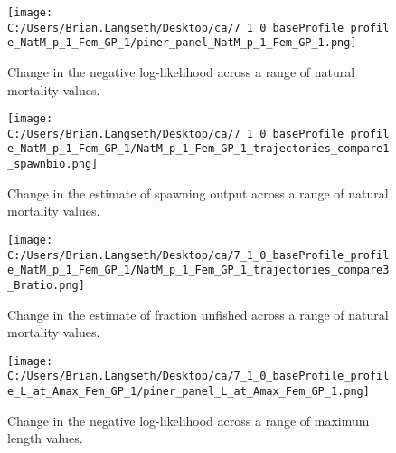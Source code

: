 \documentclass[11pt,
  english,
  letterpaper,
]{article}
\begin{document}
\begin{figure}
\centering
\texttt{[image: C:/Users/Brian.Langseth/Desktop/ca/7\_1\_0\_baseProfile\_profile\_NatM\_p\_1\_Fem\_GP\_1/piner\_panel\_NatM\_p\_1\_Fem\_GP\_1.png]}
\caption{Change in the negative log-likelihood across a range of natural mortality values.\label{fig:m-profile}}
\end{figure}

\tagmcend\tagstructend


\begin{figure}
\centering
\texttt{[image: C:/Users/Brian.Langseth/Desktop/ca/7\_1\_0\_baseProfile\_profile\_NatM\_p\_1\_Fem\_GP\_1/NatM\_p\_1\_Fem\_GP\_1\_trajectories\_compare1\_spawnbio.png]}
\caption{Change in the estimate of spawning output across a range of natural mortality values.\label{fig:m-ssb}}
\end{figure}

\tagmcend\tagstructend


\begin{figure}
\centering
\texttt{[image: C:/Users/Brian.Langseth/Desktop/ca/7\_1\_0\_baseProfile\_profile\_NatM\_p\_1\_Fem\_GP\_1/NatM\_p\_1\_Fem\_GP\_1\_trajectories\_compare3\_Bratio.png]}
\caption{Change in the estimate of fraction unfished across a range of natural mortality values.\label{fig:m-depl}}
\end{figure}

\tagmcend\tagstructend


\begin{figure}
\centering
\texttt{[image: C:/Users/Brian.Langseth/Desktop/ca/7\_1\_0\_baseProfile\_profile\_L\_at\_Amax\_Fem\_GP\_1/piner\_panel\_L\_at\_Amax\_Fem\_GP\_1.png]}
\caption{Change in the negative log-likelihood across a range of maximum length values.\label{fig:linf-profile}}
\end{figure}
\end{document}
